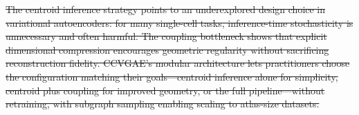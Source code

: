 \documentclass[referee, pdflatex, sn-vancouver-num]{sn-jnl}
\providecommand{\DIFdeltex}[1]{{\protect\color{red}\sout{#1}}}                      %
\providecommand{\DIFdelbegin}{} %
\providecommand{\DIFdelend}{} %
\providecommand{\DIFdel}[1]{\texorpdfstring{\DIFdeltex{#1}}{}} %
\newcommand{\DIFscaledelfig}{0.5}
\newlength{\DIFdelgraphicswidth} %
\newlength{\DIFdelgraphicsheight} %
\newcommand{\DIFdelincludegraphics}[2][]{%
\sbox{\DIFdelgraphicsbox}{\DIFOincludegraphics[#1]{#2}}%
\settoboxwidth{\DIFdelgraphicswidth}{\DIFdelgraphicsbox} %
\settoboxtotalheight{\DIFdelgraphicsheight}{\DIFdelgraphicsbox} %
\scalebox{\DIFscaledelfig}{%
\parbox[b]{\DIFdelgraphicswidth}{\usebox{\DIFdelgraphicsbox}\\[-\baselineskip] \rule{\DIFdelgraphicswidth}{0em}}\llap{\resizebox{\DIFdelgraphicswidth}{\DIFdelgraphicsheight}{%
\setlength{\unitlength}{\DIFdelgraphicswidth}%
\begin{picture}(1,1)%
\thicklines\linethickness{2pt} %
{\color[rgb]{1,0,0}\put(0,0){\framebox(1,1){}}}%
{\color[rgb]{1,0,0}\put(0,0){\line( 1,1){1}}}%
{\color[rgb]{1,0,0}\put(0,1){\line(1,-1){1}}}%
\end{picture}%
}\hspace*{3pt}}} %
} %
\DeclareRobustCommand{\DIFdelbegin}{\DIFOdelbegin \let\includegraphics\DIFdelincludegraphics} %
\DeclareRobustCommand{\DIFdelend}{\DIFOaddend \let\includegraphics\DIFOincludegraphics} %
\begin{document}
\DIFdelbegin \DIFdel{The centroid inference strategy points to an underexplored design choice in variational autoencoders: for many single-cell tasks, inference-time stochasticity is unnecessary and often harmful. The coupling bottleneck shows that explicit dimensional compression encourages geometric regularity without sacrificing reconstruction fidelity. CCVGAE's modular architecture lets practitioners choose the configuration matching their goals---centroid inference alone for simplicity, centroid plus coupling for improved geometry, or the full pipeline---without retraining, with subgraph sampling enabling scaling to atlas-size datasets.
}\DIFdelend %
\end{document}
